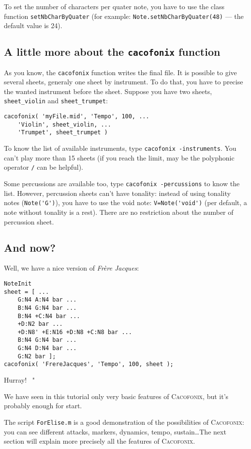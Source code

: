 \documentclass{article}
\newcommand\cacofonix{\textsc{Cacofonix}\xspace}
\newcommand\frerejaques{\emph{Fr\`ere Jacques}\xspace}
\newenvironment{meenv}{ \par \noindent \makebox[6em][r]{ \textcolor{mecolor}{Me}: " --~}}{~"}
\newcommand{ \me }[1]{%
\begin{meenv}%
	#1%
\end{meenv} }
\begin{document}
To set the number of characters per quater note, you have to use the class function \lstinline!setNbCharByQuater! (for example: \lstinline!Note.setNbCharByQuater(48)! --- the default value is 24).

\subsection{A little more about the \lstinline!cacofonix! function}

As you know, the \lstinline!cacofonix! function writes the final file. It is possible to give several sheets, generaly one sheet by instrument. To do that, you have to precise the wanted instrument before the sheet. Suppose you have two sheets, \lstinline!sheet_violin! and \lstinline!sheet_trumpet!:
\begin{lstlisting}
cacofonix( 'myFile.mid', 'Tempo', 100, ...
	'Violin', sheet_violin, ...
	'Trumpet', sheet_trumpet )
\end{lstlisting}

To know the list of available instruments, type \lstinline!cacofonix -instruments!. You can't play more than 15 sheets (if you reach the limit, may be the polyphonic operator \lstinline!/! can be helpful).

Some percussions are available too, type \lstinline!cacofonix -percussions! to know the list. However, percussion sheets can't have tonality: instead of using tonality notes (\lstinline!Note('G')!), you have to use the void note: \lstinline!V=Note('void')! (per default, a note without tonality is a rest). There are no restriction about the number of percussion sheet.

\subsection{And now?}

Well, we have a nice version of \frerejaques:
\begin{lstlisting}
NoteInit
sheet = [ ...
	G:N4 A:N4 bar ...
	B:N4 G:N4 bar ...
	B:N4 +C:N4 bar ...
	+D:N2 bar ...
	+D:N8' +E:N16 +D:N8 +C:N8 bar ...
	B:N4 G:N4 bar ...
	G:N4 D:N4 bar ...
	G:N2 bar ];
cacofonix( 'FrereJacques', 'Tempo', 100, sheet );
\end{lstlisting}

\me{ Hurray! }

We have seen in this tutorial only very basic features of \cacofonix, but it's probably enough for start.

The script \texttt{ForElise.m} is a good demonstration of the possibilities of \cacofonix: you can see different attacks, markers, dynamics, tempo, sustain\dots The next section will explain more precisely all the features of \cacofonix.
\end{document}
